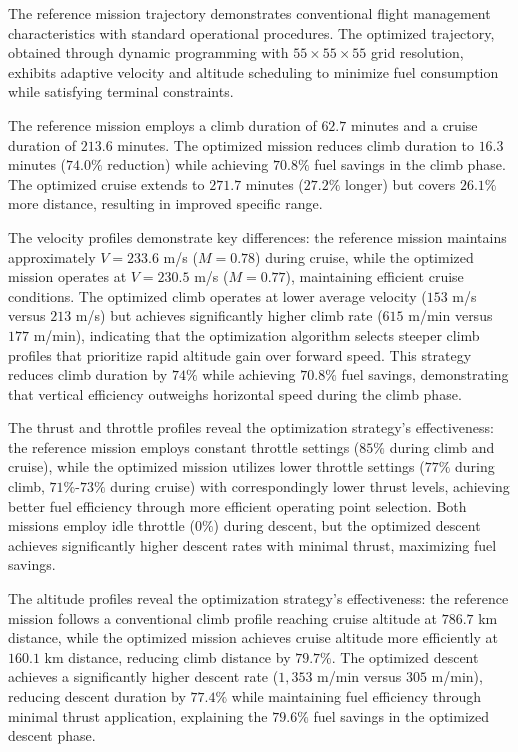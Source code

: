
The reference mission trajectory demonstrates conventional flight management characteristics with standard operational procedures. The optimized trajectory, obtained through dynamic programming with $55 \times 55 \times 55$ grid resolution, exhibits adaptive velocity and altitude scheduling to minimize fuel consumption while satisfying terminal constraints.

The reference mission employs a climb duration of $62.7$ minutes and a cruise duration of $213.6$ minutes. The optimized mission reduces climb duration to $16.3$ minutes ($74.0\%$ reduction) while achieving $70.8\%$ fuel savings in the climb phase. The optimized cruise extends to $271.7$ minutes ($27.2\%$ longer) but covers $26.1\%$ more distance, resulting in improved specific range.

The velocity profiles demonstrate key differences: the reference mission maintains approximately $V = 233.6$ m/s ($M = 0.78$) during cruise, while the optimized mission operates at $V = 230.5$ m/s ($M = 0.77$), maintaining efficient cruise conditions. The optimized climb operates at lower average velocity ($153$ m/s versus $213$ m/s) but achieves significantly higher climb rate ($615$ m/min versus $177$ m/min), indicating that the optimization algorithm selects steeper climb profiles that prioritize rapid altitude gain over forward speed. This strategy reduces climb duration by $74\%$ while achieving $70.8\%$ fuel savings, demonstrating that vertical efficiency outweighs horizontal speed during the climb phase.

The thrust and throttle profiles reveal the optimization strategy's effectiveness: the reference mission employs constant throttle settings ($85\%$ during climb and cruise), while the optimized mission utilizes lower throttle settings ($77\%$ during climb, $71\%$-$73\%$ during cruise) with correspondingly lower thrust levels, achieving better fuel efficiency through more efficient operating point selection. Both missions employ idle throttle ($0\%$) during descent, but the optimized descent achieves significantly higher descent rates with minimal thrust, maximizing fuel savings.

The altitude profiles reveal the optimization strategy's effectiveness: the reference mission follows a conventional climb profile reaching cruise altitude at $786.7$ km distance, while the optimized mission achieves cruise altitude more efficiently at $160.1$ km distance, reducing climb distance by $79.7\%$. The optimized descent achieves a significantly higher descent rate ($1,353$ m/min versus $305$ m/min), reducing descent duration by $77.4\%$ while maintaining fuel efficiency through minimal thrust application, explaining the $79.6\%$ fuel savings in the optimized descent phase.
